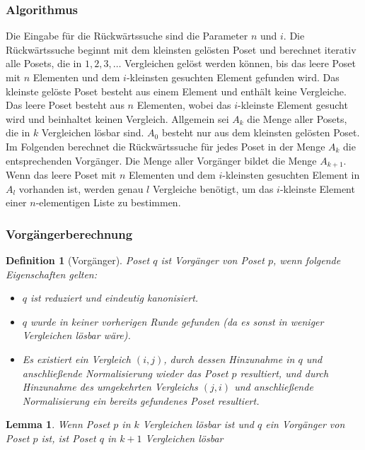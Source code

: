 \documentclass[10pt,journal,compsoc]{IEEEtran}
\newtheorem{lemma}{Lemma}
\newtheorem{definition}{Definition}
\begin{document}
\subsubsection{Algorithmus} \label{sec:backward:algorithm}

Die Eingabe für die Rückwärtssuche sind die Parameter $n$ und $i$.
Die Rückwärtssuche beginnt mit dem kleinsten gelösten Poset und berechnet iterativ alle Posets, die in $1, 2, 3, \dots$ Vergleichen gelöst werden können, bis das leere Poset mit $n$ Elementen und dem $i$-kleinsten gesuchten Element gefunden wird.
Das kleinste gelöste Poset besteht aus einem Element und enthält keine Vergleiche.
Das leere Poset besteht aus $n$ Elementen, wobei das $i$-kleinste Element gesucht wird und beinhaltet keinen Vergleich.
Allgemein sei $A_k$ die Menge aller Posets, die in $k$ Vergleichen lösbar sind.
$A_0$ besteht nur aus dem kleinsten gelösten Poset.
Im Folgenden berechnet die Rückwärtssuche für jedes Poset in der Menge $A_k$ die entsprechenden Vorgänger.
Die Menge aller Vorgänger bildet die Menge $A_{k + 1}$.
Wenn das leere Poset mit $n$ Elementen und dem $i$-kleinsten gesuchten Element in $A_l$ vorhanden ist, werden genau $l$ Vergleiche benötigt, um das $i$-kleinste Element einer $n$-elementigen Liste zu bestimmen.

\subsubsection{Vorgängerberechnung} \label{sec:backward:predecessor_calculation}

\begin{definition}[Vorgänger] \label{definition:predecessor_calculation}
  Poset $q$ ist Vorgänger von Poset $p$, wenn folgende Eigenschaften gelten:
  \begin{itemize}
    \item $q$ ist reduziert und eindeutig kanonisiert.
    \item $q$ wurde in keiner vorherigen Runde gefunden (da es sonst in weniger Vergleichen lösbar wäre).
    \item Es existiert ein Vergleich $(i, j)$, durch dessen Hinzunahme in $q$ und anschließende Normalisierung wieder das Poset $p$ resultiert, und durch Hinzunahme des umgekehrten Vergleichs $(j, i)$ und anschließende Normalisierung ein bereits gefundenes Poset resultiert.
  \end{itemize}
\end{definition}

\begin{lemma} \label{lemma:predecessor_calculation}
  Wenn Poset $p$ in $k$ Vergleichen lösbar ist und $q$ ein Vorgänger von Poset $p$ ist, ist Poset $q$ in $k + 1$ Vergleichen lösbar
\end{lemma}
\end{document}
